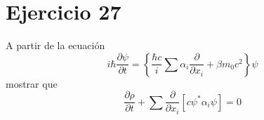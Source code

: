 \section*{Ejercicio 27}
A partir de la ecuación 
\begin{equation*}
    i\hbar \frac{\partial \psi}{\partial t} = \left\lbrace \frac{\hbar c}{i}
    \sum \alpha_i \frac{\partial}{\partial x_i}+\beta m_0c^2\right\rbrace \psi
\end{equation*}
mostrar que 
\begin{equation*}
    \frac{\partial \rho}{\partial t} + \sum \frac{\partial}{\partial x_i} \left[c\psi^* \alpha_i \psi \right] = 0
\end{equation*}